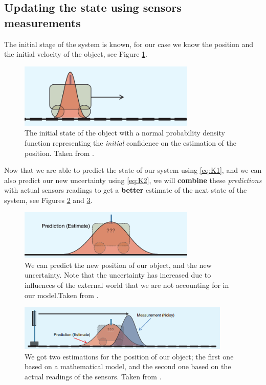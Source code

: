 \documentclass[12pt,a4paper,final]{article} %
\begin{document}
\subsection{Updating the state using sensors measurements}
The initial stage of the system is known, for our case we know the
position and the initial velocity of the object, see Figure
\ref{fig:object_1D_01}.
\begin{figure}
  \centering
  \includegraphics[width=0.75\textwidth]{object_1D_01}
  \caption{The initial state of the object with a normal probability
    density function representing the \textit{initial} confidence on
    the estimation of the position. Taken from
    \cite{Faragher:2012:AR}.}
  \label{fig:object_1D_01}
\end{figure}

Now that we are able to predict the state of our system using
\eqref{eq:K1}, and we can also predict our new uncertainty using
\eqref{eq:K2}, we will \textbf{combine} these \textit{predictions}
with actual sensors readings to get a \textbf{better} estimate of the
next state of the system, see Figures \ref{fig:object_1D_02} and
\ref{fig:object_1D_03}.

\begin{figure}
  \centering
  \includegraphics[width=0.75\textwidth]{object_1D_02}
  \caption{We can predict the new position of our object, and the new
    uncertainty. Note that the uncertainty has increased due to
    influences of the external world that we are not accounting for in
    our model.Taken from \cite{Faragher:2012:AR}.}
  \label{fig:object_1D_02}
\end{figure}

\begin{figure}
  \centering
  \includegraphics[width=0.90\textwidth]{object_1D_03}
  \caption{We got two estimations for the position of our object; the
    first one based on a mathematical model, and the second one based
    on the actual readings of the sensors. Taken from
    \cite{Faragher:2012:AR}.}
  \label{fig:object_1D_03}
\end{figure}
\end{document}
